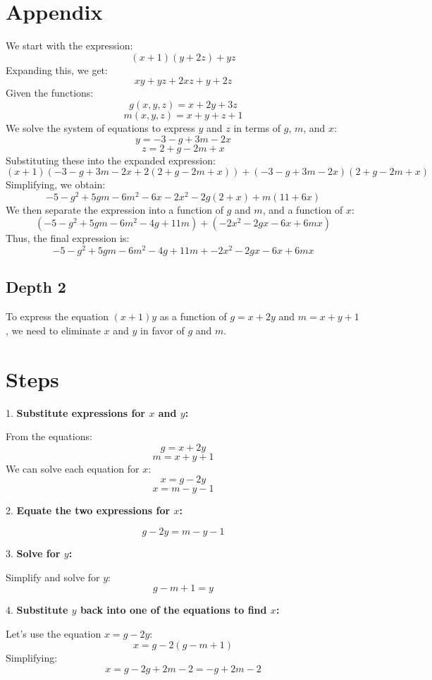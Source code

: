 \documentclass[11pt]{article}
\begin{document}
\section{Appendix}
We start with the expression:
\[
(x+1)(y+2z) + yz
\]
Expanding this, we get:
\[
xy + yz + 2xz + y + 2z
\]
Given the functions:
\[
g(x, y, z) = x + 2y + 3z
\]
\[
m(x, y, z) = x + y + z + 1
\]
We solve the system of equations to express \( y \) and \( z \) in terms of \( g \), \( m \), and \( x \):
\[
y = -3 - g + 3m - 2x
\]
\[
z = 2 + g - 2m + x
\]
Substituting these into the expanded expression:
\[
(x + 1)\left(-3 - g + 3m - 2x + 2(2 + g - 2m + x)\right) + \left(-3 - g + 3m - 2x\right)\left(2 + g - 2m + x\right)
\]
Simplifying, we obtain:
\[
-5 - g^2 + 5gm - 6m^2 - 6x - 2x^2 - 2g(2 + x) + m(11 + 6x)
\]
We then separate the expression into a function of \( g \) and \( m \), and a function of \( x \):
\[
(-5 - g^2 + 5gm - 6m^2 - 4g + 11m) + (-2x^2 - 2gx - 6x + 6mx)
\]
Thus, the final expression is:
\[
\boxed{-5 - g^2 + 5gm - 6m^2 - 4g + 11m} + \boxed{-2x^2 - 2gx - 6x + 6mx}
\]

\subsection{Depth 2}
To express the equation \((x + 1)y\) as a function of \(g = x + 2y\) and \(m = x + y + 1\), we need to eliminate \(x\) and \(y\) in favor of \(g\) and \(m\).

\section*{Steps}

1. \textbf{Substitute expressions for \(x\) and \(y\):}

   From the equations:
   \[
   g = x + 2y
   \]
   \[
   m = x + y + 1
   \]
   We can solve each equation for \(x\):
   \[
   x = g - 2y
   \]
   \[
   x = m - y - 1
   \]

2. \textbf{Equate the two expressions for \(x\):}

   \[
   g - 2y = m - y - 1
   \]

3. \textbf{Solve for \(y\):}

   Simplify and solve for \(y\):
   \[
   g - m + 1 = y
   \]

4. \textbf{Substitute \(y\) back into one of the equations to find \(x\):}

   Let's use the equation \(x = g - 2y\):
   \[
   x = g - 2(g - m + 1)
   \]
   Simplifying:
   \[
   x = g - 2g + 2m - 2 = -g + 2m - 2
   \]
\end{document}
